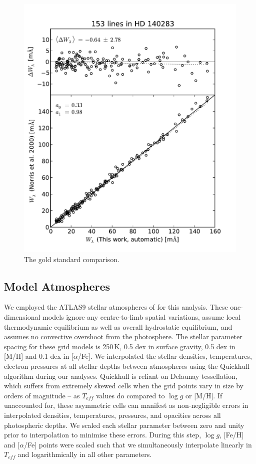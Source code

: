 \documentclass{emulateapj}
\begin{document}
\begin{figure}[h]
	\includegraphics[width=\columnwidth]{./figures/smh-norris.pdf}
	\caption{The gold standard comparison.}
	\label{fig:ew-compare}
\end{figure}


\subsection{Model Atmospheres}
We employed the ATLAS9 stellar atmospheres of \citet{Castelli;Kurucz_2003} for this analysis. These one-dimensional models ignore any centre-to-limb spatial variations, assume local thermodynamic equilibrium as well as overall hydrostatic equilibrium, and assumes no convective overshoot from the photosphere. The stellar parameter spacing for these grid models is 250\,K, 0.5 dex in surface gravity, 0.5 dex in [M/H] and 0.1 dex in [$\alpha$/Fe]. We interpolated the stellar densities, temperatures, electron pressures at all stellar depths between atmospheres using the Quickhull algorithm during our analyses. Quickhull is reliant on Delaunay tessellation, which suffers from extremely skewed cells when the grid points vary in size by orders of magnitude -- as $T_{eff}$ values do compared to $\log{g}$ or [M/H]. If unaccounted for, these asymmetric cells can manifest as non-negligible errors in interpolated densities, temperatures, pressures, and opacities across all photospheric depths. We scaled each stellar parameter between zero and unity prior to interpolation to minimise these errors. During this step, $\log{g}$, [Fe/H] and [$\alpha$/Fe] points were scaled such that we simultaneously interpolate linearly in $T_{eff}$ and logarithmically in all other parameters.
\end{document}
